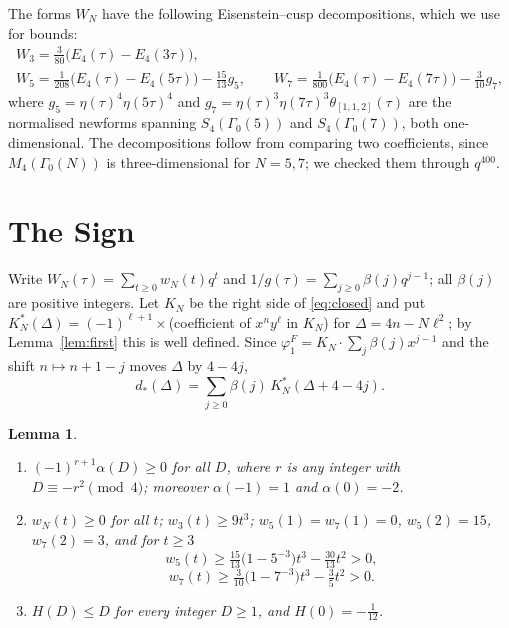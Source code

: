 \documentclass[11pt]{amsart}
\numberwithin{equation}{section}
\theoremstyle{plain}
\newtheorem{lem}[thm]{Lemma}
\theoremstyle{remark}
\begin{document}
The forms $W_N$ have the following Eisenstein--cusp decompositions, which we use for bounds:
\begin{equation}\label{eq:decomp}
\begin{gathered}
W_3=\tfrac{3}{80}\bigl(E_4(\tau)-E_4(3\tau)\bigr),\\
W_5=\tfrac{1}{208}\bigl(E_4(\tau)-E_4(5\tau)\bigr)-\tfrac{15}{13}g_5,\qquad
W_7=\tfrac{1}{800}\bigl(E_4(\tau)-E_4(7\tau)\bigr)-\tfrac{3}{10}g_7,
\end{gathered}
\end{equation}
where $g_5=\eta(\tau)^4\eta(5\tau)^4$ and $g_7=\eta(\tau)^3\eta(7\tau)^3\theta_{[1,1,2]}(\tau)$ are the normalised newforms spanning $S_4(\Gamma_0(5))$ and $S_4(\Gamma_0(7))$, both one-dimensional. The decompositions follow from comparing two coefficients, since $M_4(\Gamma_0(N))$ is three-dimensional for $N=5,7$; we checked them through $q^{400}$.

\section{The Sign}\label{sec:sign}

Write $W_N(\tau)=\sum_{t\ge0}w_N(t)q^t$ and $1/g(\tau)=\sum_{j\ge0}\beta(j)q^{j-1}$; all $\beta(j)$ are positive integers. Let $K_N$ be the right side of \eqref{eq:closed} and put $K^*_N(\Delta)=(-1)^{\ell+1}\times$(coefficient of $x^ny^\ell$ in $K_N$) for $\Delta=4n-N\ell^2$; by Lemma~\ref{lem:first} this is well defined. Since $\varphi^F_1=K_N\cdot\sum_j\beta(j)x^{j-1}$ and the shift $n\mapsto n+1-j$ moves $\Delta$ by $4-4j$,
\begin{equation}\label{eq:dsum}
d_*(\Delta)=\sum_{j\ge0}\beta(j)\,K^*_N(\Delta+4-4j).
\end{equation}

\begin{lem}\label{lem:facts}
\begin{enumerate}
\item[(i)] $(-1)^{r+1}\alpha(D)\ge0$ for all $D$, where $r$ is any integer with $D\equiv -r^2\pmod 4$; moreover $\alpha(-1)=1$ and $\alpha(0)=-2$.
\item[(ii)] $w_N(t)\ge0$ for all $t$; $w_3(t)\ge9t^3$; $w_5(1)=w_7(1)=0$, $w_5(2)=15$, $w_7(2)=3$, and for $t\ge3$
\[
w_5(t)\ge\tfrac{15}{13}\bigl(1-5^{-3}\bigr)t^3-\tfrac{30}{13}t^2>0,\]\[ w_7(t)\ge\tfrac{3}{10}\bigl(1-7^{-3}\bigr)t^3-\tfrac35t^2>0.
\]
\item[(iii)] $H(D)\le D$ for every integer $D\ge1$, and $H(0)=-\tfrac1{12}$.
\end{enumerate}
\end{lem}
\end{document}
